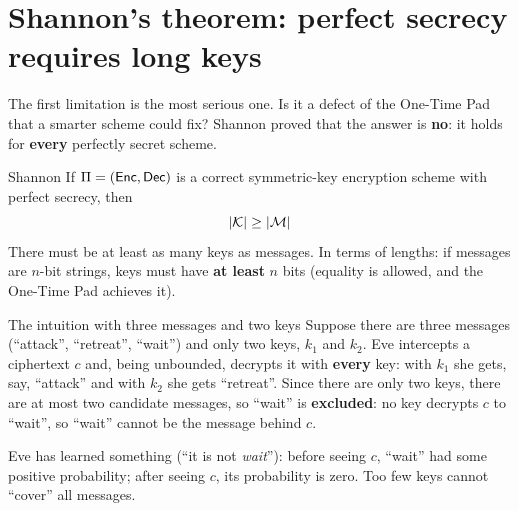 \section{Shannon's theorem: perfect secrecy requires long keys}

The first limitation is the most serious one. Is it a defect of the One-Time Pad that a smarter scheme could fix? Shannon proved that the answer is \textbf{no}: it holds for \textbf{every} perfectly secret scheme.

\begin{framedthm}[label={thm:shannon}]{Shannon}
  If $\Pi = (\mathsf{Enc}, \mathsf{Dec})$ is a correct symmetric-key encryption scheme with perfect secrecy, then
  \[
    |\mathcal{K}| \geq |\mathcal{M}|
  \]
  There must be at least as many keys as messages. In terms of lengths: if messages are $n$-bit strings, keys must have \textbf{at least} $n$ bits (equality is allowed, and the One-Time Pad achieves it).
\end{framedthm}

\begin{framedex}{The intuition with three messages and two keys}
  Suppose there are three messages (``attack'', ``retreat'', ``wait'') and only two keys, $k_1$ and $k_2$. Eve intercepts a ciphertext $c$ and, being unbounded, decrypts it with \textbf{every} key: with $k_1$ she gets, say, ``attack'' and with $k_2$ she gets ``retreat''. Since there are only two keys, there are at most two candidate messages, so ``wait'' is \textbf{excluded}: no key decrypts $c$ to ``wait'', so ``wait'' cannot be the message behind $c$.

  Eve has learned something (``it is not \textit{wait}''): before seeing $c$, ``wait'' had some positive probability; after seeing $c$, its probability is zero. Too few keys cannot ``cover'' all messages.
\end{framedex}


